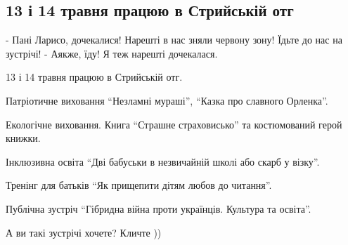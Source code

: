  
 
 
 
 

\subsection{13 і 14 травня працюю в Стрийській отг}

- Пані Ларисо, дочекалися! Нарешті в нас зняли червону зону! Їдьте до нас на зустрічі!
- Аякже, їду! Я теж нарешті дочекалася. 

13 і 14 травня працюю в Стрийській отг. 

Патріотичне виховання \enquote{Незламні мураші}, \enquote{Казка про славного Орленка}.

Екологічне виховання. Книга  \enquote{Страшне страховисько} та костюмований герой книжки.

Інклюзивна освіта \enquote{Дві бабуськи в незвичайній школі або скарб у візку}. 

Тренінг для батьків \enquote{Як прищепити дітям любов до читання}.

Публічна зустріч \enquote{Гібридна війна проти українців. Культура та освіта}. 

А ви такі зустрічі хочете? Кличте ))
